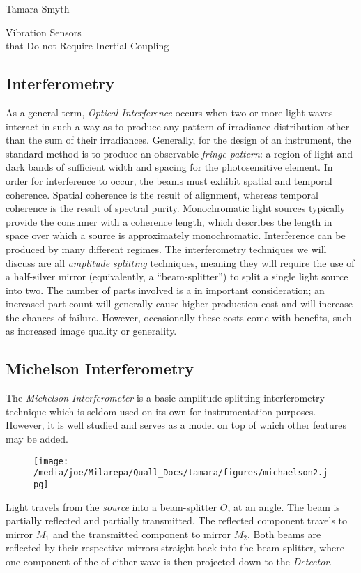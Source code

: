 \documentclass[a4paper,10pt]{report}
\numberwithin{equation}{section}
\begin{document}
\begin{chapter}{Tamara Smyth}
\begin{section}{Vibration Sensors \\that Do not Require Inertial Coupling}
 \subsection{Interferometry}
 As a general term, \emph{Optical Interference} occurs when two or more light waves interact in such a way as to produce any pattern of irradiance distribution other than the sum of their irradiances.\cite[p.~367]{Hecht1987} Generally, for the design of an instrument, the standard method is to produce an observable \emph{fringe pattern}: a region of light and dark bands of sufficient width and spacing for the photosensitive element. In order for interference to occur, the beams must exhibit spatial and temporal coherence. Spatial coherence is the result of alignment, whereas temporal coherence is the result of spectral purity.\cite[p.~371]{Hecht1987} Monochromatic light sources typically provide the consumer with a coherence length, which describes the length in space over which a source is approximately monochromatic. \cite[p.~298]{Hecht1987} Interference can be produced by many different regimes. The interferometry techniques we will discuss are all \emph{amplitude splitting} techniques, meaning they will 
require the use of a half-silver mirror (equivalently, a ``beam-splitter'') to split a single light source into two. The number of parts involved is a in important consideration; an increased part count will generally cause higher production cost and will increase the chances of failure. However, occasionally these costs come with benefits, such as increased image quality or generality.
 \subsection{Michelson Interferometry}
 The \emph{Michelson Interferometer} is a basic amplitude-splitting interferometry technique which is seldom used on its own for instrumentation purposes.\cite[p.~387]{Hecht1987} However, it is well studied and serves as a model on top of which other features may be added. 
\begin{figure}
\texttt{[image: /media/joe/Milarepa/Quall\_Docs/tamara/figures/michaelson2.jpg]}
\end{figure}
 Light travels from the \emph{source} into a beam-splitter $O$, at an angle. The beam is partially reflected and partially transmitted. The reflected component travels to mirror $M_1$ and the transmitted component to mirror $M_2$. Both beams are reflected by their respective mirrors straight back into the beam-splitter, where one component of the of either wave is then projected down to the \emph{Detector}.
 

\end{section}
\end{chapter}
\end{document}
